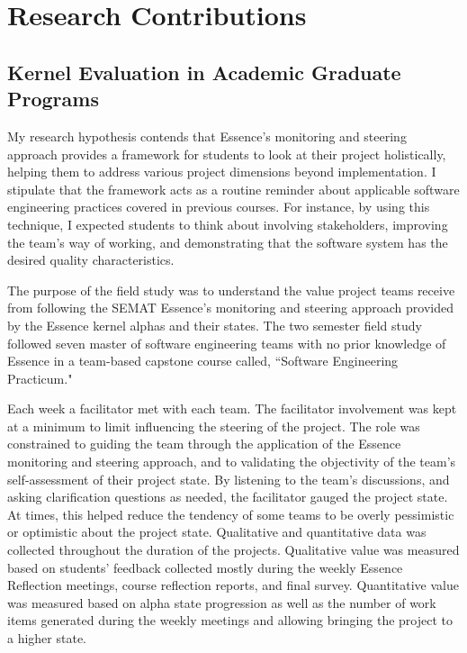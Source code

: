 \documentclass[preprint,12pt,3p]{elsarticle}
\begin{document}
\section{Research Contributions}

\subsection{Kernel Evaluation in Academic Graduate Programs}
\label{CMUFieldStudy}
My research hypothesis contends that Essence's monitoring and steering approach provides a framework for students to look at their project holistically, helping them to address various project dimensions beyond implementation. I stipulate that the framework acts as a routine reminder about applicable software engineering practices covered in previous courses. For instance, by using this technique, I expected students to think about involving stakeholders, improving the team's way of working, and demonstrating that the software system has the desired quality characteristics.

The purpose of the field study \cite{ICSE2014} was to understand the value project teams receive from following the SEMAT Essence's monitoring and steering approach provided by the Essence kernel alphas and their states.  The two semester field study followed seven master of software engineering teams with no prior knowledge of Essence in a team-based capstone course called, ``Software Engineering Practicum." 

Each week a facilitator met with each team. The facilitator involvement was kept at a minimum to limit influencing the steering of the project. The role was constrained to guiding the team through the application of the Essence monitoring and steering approach, and to validating the objectivity of the team's self-assessment of their project state. By listening to the team's discussions, and asking clarification questions as needed, the facilitator gauged the project state. At times, this helped reduce the tendency of some teams to be overly pessimistic or optimistic about the project state. Qualitative and quantitative data was collected throughout the duration of the projects. Qualitative value was measured based on students' feedback collected mostly during the weekly Essence Reflection meetings, course reflection reports, and final survey. Quantitative value was measured based on alpha state progression as well as the number of work items generated during the weekly meetings and allowing bringing the project to a higher state.
\end{document}
